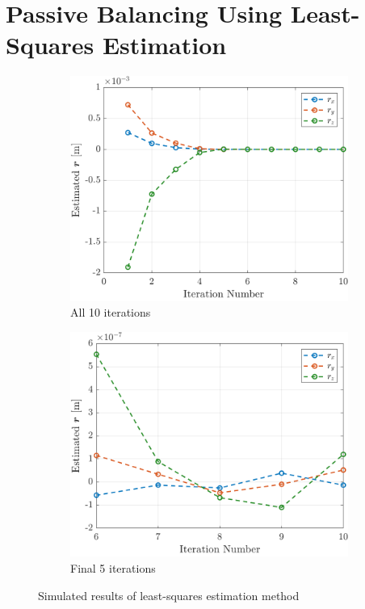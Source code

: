 \section{Passive Balancing Using Least-Squares Estimation}

\begin{figure}[!ht]
  \centering
  \begin{subfigure}[t]{0.47\textwidth}
    \includegraphics[width=\linewidth]{plots/LSR_sim_all_runs.png}
    \caption{All 10 iterations}\label{fig:a}
  \end{subfigure}\hfill
  \begin{subfigure}[t]{0.47\textwidth}
    \includegraphics[width=\linewidth]{plots/LSR_sim_last_5_runs.png}
    \caption{Final 5 iterations}\label{fig:b}
  \end{subfigure}
  \caption{Simulated results of least-squares estimation method}
  \label{fig:twopanels}
\end{figure}

